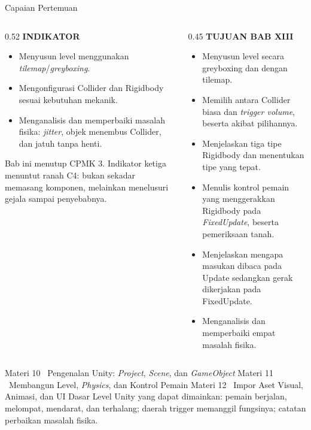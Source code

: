 \documentclass[aspectratio=169,10pt]{beamer}
\begin{document}
\begin{frame}{Capaian Pertemuan}
\begin{columns}[T,onlytextwidth]
\begin{column}{0.52\textwidth}
    {\fontsize{7}{8.5}\selectfont\bfseries\color{ubAccent}INDIKATOR}\par
    \vspace{0.06cm}
    \begin{itemize}
      \item Menyusun level menggunakan \emph{tilemap}/\emph{greyboxing}.
      \item Mengonfigurasi Collider dan Rigidbody sesuai kebutuhan mekanik.
      \item Menganalisis dan memperbaiki masalah fisika: \emph{jitter}, objek
            menembus Collider, dan jatuh tanpa henti.
    \end{itemize}
    \vspace{0.10cm}
    \begin{kotak}
      Bab ini menutup CPMK 3. Indikator ketiga menuntut ranah C4: bukan sekadar
      memasang komponen, melainkan menelusuri gejala sampai penyebabnya.
    \end{kotak}
  \end{column}
  \begin{column}{0.45\textwidth}
    {\fontsize{7}{8.5}\selectfont\bfseries\color{ubAccent}TUJUAN BAB XIII}\par
    \vspace{0.08cm}
    \begin{itemize}
      \item Menyusun level secara greyboxing dan dengan tilemap.
      \item Memilih antara Collider biasa dan \emph{trigger volume}, beserta
            akibat pilihannya.
      \item Menjelaskan tiga tipe Rigidbody dan menentukan tipe yang tepat.
      \item Menulis kontrol pemain yang menggerakkan Rigidbody pada
            \emph{FixedUpdate}, beserta pemeriksaan tanah.
      \item Menjelaskan mengapa masukan dibaca pada Update sedangkan gerak
            dikerjakan pada FixedUpdate.
      \item Menganalisis dan memperbaiki empat masalah fisika.
    \end{itemize}
  \end{column}
\end{columns}
\end{frame}

  {Materi 10 \textperiodcentered\ Pengenalan Unity: \emph{Project},
   \emph{Scene}, dan \emph{GameObject}}
  {Materi 11 \textperiodcentered\ Membangun Level, \emph{Physics}, dan Kontrol
   Pemain}
  {Materi 12 \textperiodcentered\ Impor Aset Visual, Animasi, dan UI Dasar}
  {Level Unity yang dapat dimainkan: pemain berjalan, melompat, mendarat,
   dan terhalang; daerah trigger memanggil fungsinya; catatan perbaikan
   masalah fisika.}
\end{document}
